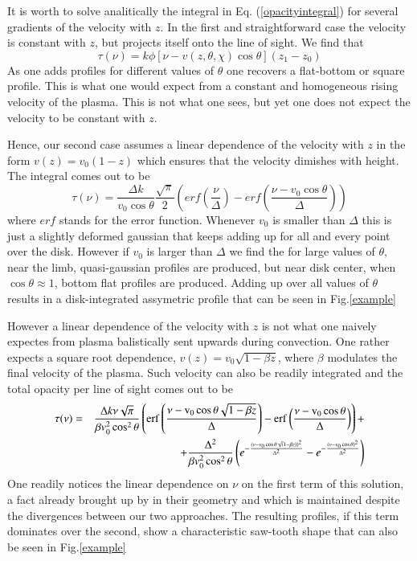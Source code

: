 \documentclass{/Users/art2/TeX/aanda/aa}
\begin{document}
It is worth to solve analitically the integral in Eq. (\ref{opacityintegral}) for several gradients of the velocity with $z$.  In the first and straightforward case the 
velocity is constant with $z$, but projects itself onto the line of sight. We find that
\begin{equation}
   \tau(\nu)=k \phi[\nu-v(z,\theta,\chi)\cos \theta](z_1-z_0)
\end{equation}
As one adds profiles for different values of $\theta$ one recovers a flat-bottom or square profile. This is what one would expect from a constant 
and homogeneous rising velocity of the plasma. This is not what one sees, but yet one does not expect the velocity to be constant with $z$.

Hence, our second case assumes a linear dependence of the velocity with $z$ in the form $v(z)=v_0(1-z)$ which ensures that the velocity dimishes 
with height. The integral comes out to be
\begin{equation}
   \tau(\nu)=\frac{\Delta k}{v_0\cos\theta}\frac{\sqrt{\pi}}{2} \left( erf\left(\frac{\nu}{\Delta}\right) - erf\left(\frac{\nu-v_0\cos\theta}{\Delta}\right) \right)
\end{equation}
where $erf$ stands for the error function. Whenever $v_0$ is smaller than $\Delta$ this is just a slightly deformed gaussian that keeps adding 
up for all and every point over the disk. However if $v_0$ is larger than $\Delta$ we find the for large values of $\theta$, near the limb, quasi-gaussian 
profiles are produced, but near disk center, when $\cos \theta \approx 1$, bottom flat profiles are produced. Adding up over all values of $\theta$ results 
in a disk-integrated assymetric profile that can be seen in Fig.\ref{example}

However a linear dependence of the velocity with $z$ is not what one naively expectes from plasma balistically sent upwards during convection. One 
rather expects a square root dependence, $v(z)=v_0\sqrt{1-\beta z}$, where  $\beta$ modulates  the final velocity of the plasma. Such 
velocity can also be readily integrated and the total opacity per line of sight comes out to be
\begin{eqnarray}
   \tau(\nu)&=&\frac{\Delta k \nu \sqrt{\pi}}{\beta v_0^2\cos^2\theta} \left( \rm{erf}\left(\frac{\nu-v_0\cos \theta\sqrt{1-\beta z}}{\Delta}\right) - \rm{erf}\left(\frac{\nu-v_0\cos\theta}{\Delta}\right) \right)+\nonumber \\
   &&+\frac{\Delta^2}{\beta v_0^2\cos^2\theta}\left(e^{-\frac{(\nu-v_0\cos\theta \sqrt(1-\beta z))^2}{\Delta^2}}-e^{-\frac{(\nu-v_0\cos\theta)^2}{\Delta^2}}\right)
\end{eqnarray}
One readily notices the linear dependence on $\nu$ on the first term of this solution, a fact already brought up by \cite{bertout_line_1987} 
in their geometry and which is maintained despite the divergences 
between our two approaches. The resulting profiles, if this term dominates over the second, show a characteristic saw-tooth shape that 
can also be seen in Fig.\ref{example}
\end{document}
